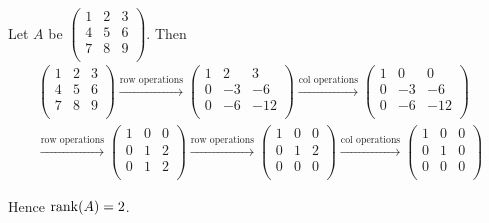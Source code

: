 \begin{example}
    Let $A$ be $ \begin{pmatrix} 
      1 & 2 & 3 \\  
      4 & 5 & 6 \\  
      7 & 8 & 9 \\  
    \end{pmatrix}
    $. Then 
    \begin{align*}
        \begin{pmatrix} 
            1 & 2 & 3 \\
            4 & 5 & 6 \\  
            7 & 8 & 9 \\  
        \end{pmatrix}
        \overset{\text{row operations}}{\longrightarrow} 
        \begin{pmatrix} 
            1 & 2 & 3 \\
            0 & -3 & -6 \\  
            0 & -6 & -12 \\  
        \end{pmatrix}
        \overset{\text{col operations}}{\longrightarrow} 
        \begin{pmatrix} 
            1 & 0 & 0 \\
            0 & -3 & -6 \\  
            0 & -6 & -12 \\  
        \end{pmatrix} \\
        \overset{\text{row operations}}{\longrightarrow} 
        \begin{pmatrix} 
            1 & 0 & 0 \\
            0 & 1 & 2 \\  
            0 & 1 & 2 \\  
        \end{pmatrix} 
        \overset{\text{row operations}}{\longrightarrow} 
        \begin{pmatrix} 
            1 & 0 & 0 \\
            0 & 1 & 2 \\  
            0 & 0 & 0 \\  
        \end{pmatrix} 
        \overset{\text{col operations}}{\longrightarrow} 
        \begin{pmatrix} 
            1 & 0 & 0 \\
            0 & 1 & 0 \\  
            0 & 0 & 0 \\  
        \end{pmatrix} 
    \end{align*}

    Hence $\rank(A) = 2$.
\end{example}

